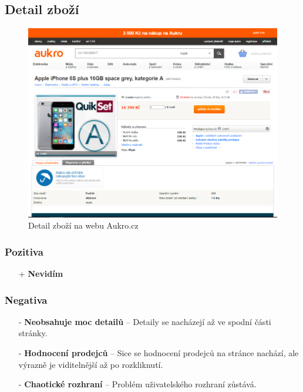 \newpage
\subsection{Detail zboží}
\begin{figure}[h]
    \centering
    \includegraphics[width=1.0\textwidth]{media/aukro/detail.png}
    \caption{Detail zboží na webu Aukro.cz}
    \label{fig:aukro:detail}
\end{figure}
\subsubsection*{Pozitiva}
\begin{itemize}
    \item[+] \textbf{Nevidím}
\end{itemize}
\subsubsection*{Negativa}
\begin{itemize}
    \item[-] \textbf{Neobsahuje moc detailů} -- Detaily se nacházejí až ve spodní části stránky.
    \item[-] \textbf{Hodnocení prodejců} -- Sice se hodnocení prodejců na stránce nachází, ale výrazně je viditelnější až po rozkliknutí.
    \item[-] \textbf{Chaotické rozhraní} -- Problém uživatelského rozhraní zůstává.
\end{itemize}



